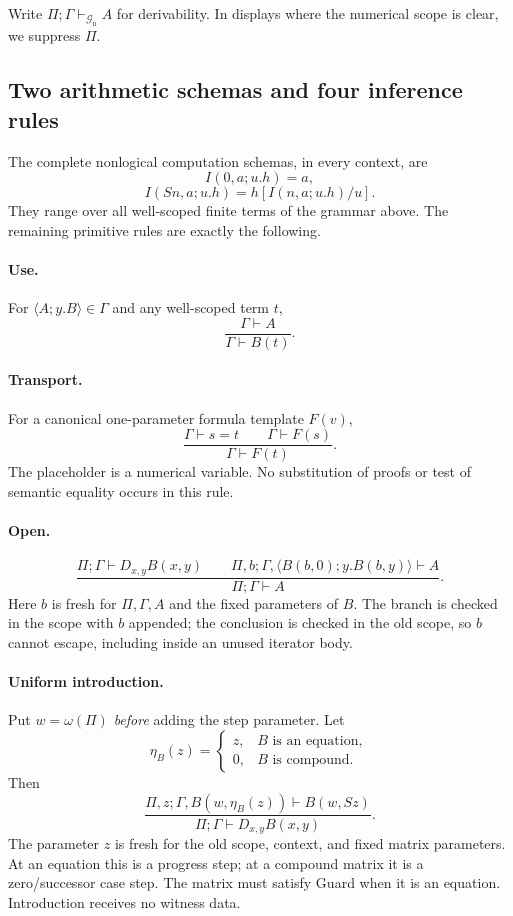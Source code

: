 \documentclass[11pt]{article}
\theoremstyle{definition}\newtheorem{definition}[theorem]{Definition}
\theoremstyle{remark}\newtheorem{remark}[theorem]{Remark}
\newcommand{\Gn}{\mathcal G_{\mathrm n}}
\newcommand{\wt}{\omega}
\begin{document}
Write $\Pi;\Gamma\vdash_{\Gn} A$ for derivability. In displays where
the numerical scope is clear, we suppress $\Pi$.

\subsection{Two arithmetic schemas and four inference rules}

The complete nonlogical computation schemas, in every context, are
\[
 I(0,a;u.h)=a,                                         \tag{I0}
\]
\[
 I(Sn,a;u.h)=h[I(n,a;u.h)/u].                          \tag{IS}
\]
They range over all well-scoped finite terms of the grammar above.
The remaining primitive rules are exactly the following.

\paragraph{Use.}
For $\langle A;y.B\rangle\in\Gamma$ and any well-scoped term $t$,
\[
 \frac{\Gamma\vdash A}{\Gamma\vdash B(t)}.             \tag{Use}
\]

\paragraph{Transport.}
For a canonical one-parameter formula template $F(v)$,
\[
 \frac{\Gamma\vdash s=t\qquad\Gamma\vdash F(s)}
      {\Gamma\vdash F(t)}.                            \tag{Tr}
\]
The placeholder is a numerical variable. No substitution of proofs or
test of semantic equality occurs in this rule.

\paragraph{Open.}
\[
 \frac{\Pi;\Gamma\vdash D_{x,y}B(x,y)\qquad
       \Pi,b;\Gamma,\langle B(b,0);y.B(b,y)\rangle\vdash A}
      {\Pi;\Gamma\vdash A}.                          \tag{Open}
\]
Here $b$ is fresh for $\Pi,\Gamma,A$ and the fixed parameters of $B$.
The branch is checked in the scope with $b$ appended; the conclusion is
checked in the old scope, so $b$ cannot escape, including inside an unused
iterator body.

\paragraph{Uniform introduction.}
Put $w=\wt(\Pi)$ \emph{before} adding the step parameter. Let
\[
 \eta_B(z)=\begin{cases}z,&B\text{ is an equation},\\
                         0,&B\text{ is compound}.
             \end{cases}
\]
Then
\[
 \boxed{\quad
 \frac{\Pi,z;\Gamma,B(w,\eta_B(z))\vdash B(w,Sz)}
      {\Pi;\Gamma\vdash D_{x,y}B(x,y)}.
 \quad}                                               \tag{Intro}
\]
The parameter $z$ is fresh for the old scope, context, and fixed matrix
parameters. At an equation this is a progress step; at a compound
matrix it is a zero/successor case step. The matrix must satisfy Guard
when it is an equation. Introduction receives no witness data.
\end{document}
